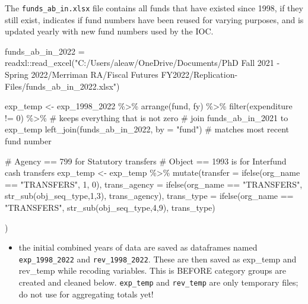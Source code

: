 \documentclass[
  letterpaper,
  DIV=11,
  numbers=noendperiod]{scrreport}
\newenvironment{Shaded}{\begin{snugshade}}{\end{snugshade}}
\newcommand{\AttributeTok}[1]{\textcolor[rgb]{0.40,0.45,0.13}{#1}}
\newcommand{\CommentTok}[1]{\textcolor[rgb]{0.37,0.37,0.37}{#1}}
\newcommand{\DecValTok}[1]{\textcolor[rgb]{0.68,0.00,0.00}{#1}}
\newcommand{\FunctionTok}[1]{\textcolor[rgb]{0.28,0.35,0.67}{#1}}
\newcommand{\NormalTok}[1]{\textcolor[rgb]{0.00,0.23,0.31}{#1}}
\newcommand{\OtherTok}[1]{\textcolor[rgb]{0.00,0.23,0.31}{#1}}
\newcommand{\SpecialCharTok}[1]{\textcolor[rgb]{0.37,0.37,0.37}{#1}}
\newcommand{\StringTok}[1]{\textcolor[rgb]{0.13,0.47,0.30}{#1}}
\providecommand{\tightlist}{%
  \setlength{\itemsep}{0pt}\setlength{\parskip}{0pt}}\usepackage{longtable,booktabs,array}
\begin{document}
The \texttt{funds\_ab\_in.xlsx} file contains all funds that have
existed since 1998, if they still exist, indicates if fund numbers have
been reused for varying purposes, and is updated yearly with new fund
numbers used by the IOC.

\begin{Shaded}
\begin{Highlighting}[]
\NormalTok{funds\_ab\_in\_2022 }\OtherTok{=}\NormalTok{ readxl}\SpecialCharTok{::}\FunctionTok{read\_excel}\NormalTok{(}\StringTok{"C:/Users/aleaw/OneDrive/Documents/PhD Fall 2021 {-} Spring 2022/Merriman RA/Fiscal Futures FY2022/Replication{-}Files/funds\_ab\_in\_2022.xlsx"}\NormalTok{)}

\NormalTok{exp\_temp }\OtherTok{\textless{}{-}}\NormalTok{ exp\_1998\_2022 }\SpecialCharTok{\%\textgreater{}\%} 
  \FunctionTok{arrange}\NormalTok{(fund, fy) }\SpecialCharTok{\%\textgreater{}\%}
  \FunctionTok{filter}\NormalTok{(expenditure }\SpecialCharTok{!=} \DecValTok{0}\NormalTok{) }\SpecialCharTok{\%\textgreater{}\%}             \CommentTok{\# keeps everything that is not zero}
\CommentTok{\# join  funds\_ab\_in\_2021  to exp\_temp}
 \FunctionTok{left\_join}\NormalTok{(funds\_ab\_in\_2022, }\AttributeTok{by =} \StringTok{"fund"}\NormalTok{)  }\CommentTok{\# matches most recent fund number }


\CommentTok{\# Agency == 799 for Statutory transfers }
\CommentTok{\#  Object == 1993 is for Interfund cash transfers  }
\NormalTok{exp\_temp }\OtherTok{\textless{}{-}}\NormalTok{ exp\_temp }\SpecialCharTok{\%\textgreater{}\%} 
  \FunctionTok{mutate}\NormalTok{(}\AttributeTok{transfer =} \FunctionTok{ifelse}\NormalTok{(org\_name }\SpecialCharTok{==} \StringTok{"TRANSFERS"}\NormalTok{, }\DecValTok{1}\NormalTok{, }\DecValTok{0}\NormalTok{),}
         \AttributeTok{trans\_agency =} \FunctionTok{ifelse}\NormalTok{(org\_name }\SpecialCharTok{==} \StringTok{"TRANSFERS"}\NormalTok{, }\FunctionTok{str\_sub}\NormalTok{(obj\_seq\_type,}\DecValTok{1}\NormalTok{,}\DecValTok{3}\NormalTok{), trans\_agency),}
         \AttributeTok{trans\_type =} \FunctionTok{ifelse}\NormalTok{(org\_name }\SpecialCharTok{==} \StringTok{"TRANSFERS"}\NormalTok{, }\FunctionTok{str\_sub}\NormalTok{(obj\_seq\_type,}\DecValTok{4}\NormalTok{,}\DecValTok{9}\NormalTok{), trans\_type)}

\NormalTok{         )}
\end{Highlighting}
\end{Shaded}

\begin{itemize}
\tightlist
\item
  the initial combined years of data are saved as dataframes named
  \texttt{exp\_1998\_2022} and \texttt{rev\_1998\_2022}. These are then
  saved as exp\_temp and rev\_temp while recoding variables. This is
  BEFORE category groups are created and cleaned below.
  \texttt{exp\_temp} and \texttt{rev\_temp} are only temporary files; do
  not use for aggregating totals yet!
\end{itemize}
\end{document}

